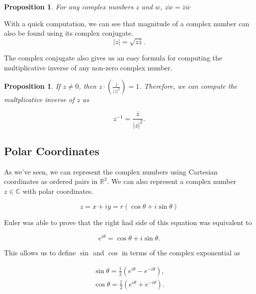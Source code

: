 \documentclass[12pt]{article}
\newcommand{\bbR}{\mathbb{R}}
\newcommand{\bbC}{\mathbb{C}}
\newcommand{\abs}[1]{ \left| #1 \right| }
\newtheorem{prop}[thm]{Proposition}
\theoremstyle{definition}
\theoremstyle{remark}
\numberwithin{equation}{section}
\begin{document}
\begin{prop}
  For any complex numbers $z$ and $w$, $\bar{zw} = \bar{z}\bar{w}$
\end{prop}

With a quick computation, we can see that magnitude of a complex number can also be found using its complex conjugate.
\begin{equation}
  \abs{z} = \sqrt{z\bar{z}}. 
\end{equation}

The complex conjugate also gives us an easy formula for computing the multiplicative inverse of any non-zero complex number.

\begin{prop}
  If $z\neq 0$, then $z\cdot \left(\frac{\bar{z}}{\left|z\right|^2}\right)=1$. Therefore, we can compute the multplicative inverse of $z$ as

  \begin{equation}
    z^{-1}  = \frac{\bar{z}}{\left|z\right|^2}. 
  \end{equation}
\end{prop}


\subsection{Polar Coordinates}%
\label{sub:polar_coordinates}

As we've seen, we can represent the complex numbers using Cartesian coordinates as ordered pairs in $\bbR^2$. We can also represent a complex number $z\in\bbC$ with polar coordinates.

\begin{equation}
  z = x + iy = r(\cos\theta + i\sin\theta)
\end{equation}

Euler was able to prove that the right had side of this equation was equivalent to

\begin{equation}
  e^{i\theta} = \cos\theta + i\sin\theta.
\end{equation}

This allows us to define $\sin$ and $\cos$ in terms of the complex exponential as

\begin{align}
  \sin\theta = \frac{1}{2}(e^{i\theta} - e^{-i\theta}),\\
  \cos\theta = \frac{1}{2}(e^{i\theta} + e^{-i\theta}).
\end{align}
\end{document}
